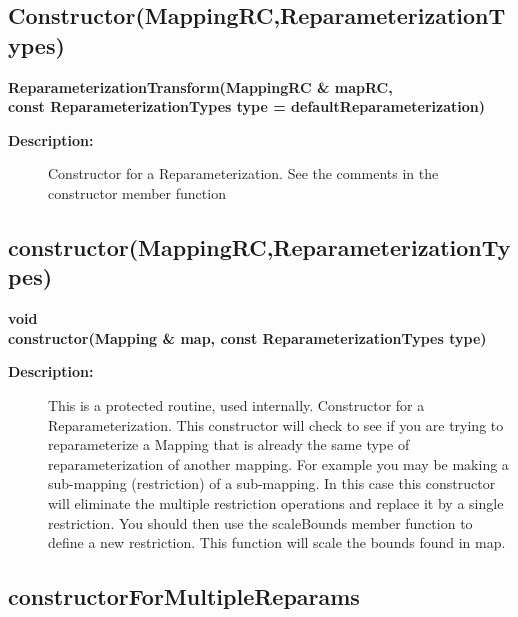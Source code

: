 \subsection{Constructor(MappingRC,ReparameterizationTypes)}
 
\begin{flushleft} \textbf{%
\settowidth{\ReparameterizationTransformIncludeArgIndent}{ReparameterizationTransform(}%
ReparameterizationTransform(MappingRC \& mapRC, \\ 
\hspace{\ReparameterizationTransformIncludeArgIndent}const ReparameterizationTypes type  = defaultReparameterization) 
}\end{flushleft}
\begin{description}
\item[{\bf Description:}]  Constructor for a Reparameterization. 
    See the comments in the constructor member function
\end{description}
\subsection{constructor(MappingRC,ReparameterizationTypes)}
 
\begin{flushleft} \textbf{%
void  \\ 
\settowidth{\ReparameterizationTransformIncludeArgIndent}{constructor(}%
constructor(Mapping \& map, const ReparameterizationTypes type)
}\end{flushleft}
\begin{description}
\item[{\bf Description:}]  This is a protected routine, used internally.
    Constructor for a Reparameterization. This constructor will
   check to see if you are trying to reparameterize a Mapping that is already
   the same type of reparameterization of another mapping. For example you may
   be making a sub-mapping (restriction) of a sub-mapping. In this case this
   constructor will eliminate the multiple restriction operations and replace
   it by a single restriction. You should then use the scaleBounds member function
   to define a new restriction. This function will scale the bounds found in map.
\end{description}
\subsection{constructorForMultipleReparams}
 
